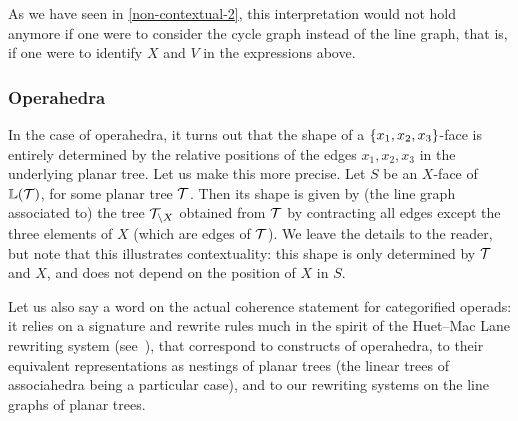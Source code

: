 \medskip

\begin{center}
\end{center}

As we have seen in \cref{non-contextual-2}, this interpretation would not hold anymore if one were to consider the cycle graph instead of the line graph, that is, if one were to identify $X$ and $V$ in the expressions above. 


\subsubsection{Operahedra}
In the case of operahedra, it turns out that the shape of a $\left\{x_1,x_2,x_3\right\}$-face is entirely determined by the relative positions of the edges $x_1,x_2,x_3$ in the underlying  planar tree.  Let us make this more precise.
Let $S$ be an $X$-face of $\mathbb{L}({\cal T})$, for some  planar tree $\cal T$. Then its shape is given by (the line graph associated to)  the tree ${\cal T}_{\setminus X}$ obtained from  ${\cal T}$  by contracting all edges except the three elements of $X$ (which are edges of ${\cal T}$).  We leave the details to the reader, but note that
this illustrates contextuality: this shape is only determined by ${\cal T}$ and $X$, and does not depend on the position of $X$ in $S$.

Let us also say a word on the actual coherence statement for categorified operads: it relies on a signature and rewrite rules much in the spirit of the Huet--Mac Lane rewriting system (see~\cite{DP15,laplante-anfossiDiagonalOperahedra2022a,CLA1}), that correspond to  constructs of operahedra,  to their equivalent representations as nestings of planar trees (the linear trees of associahedra being a particular case), and to our rewriting systems on the line graphs of planar trees. 

